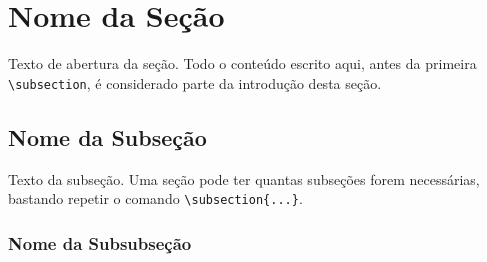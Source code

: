 %

\section{Nome da Seção}

Texto de abertura da seção. Todo o conteúdo escrito aqui, antes da
primeira \verb|\subsection|, é considerado parte da introdução desta
seção.

\subsection{Nome da Subseção}

Texto da subseção. Uma seção pode ter quantas subseções forem
necessárias, bastando repetir o comando \verb|\subsection{...}|.

\subsubsection{Nome da Subsubseção}

